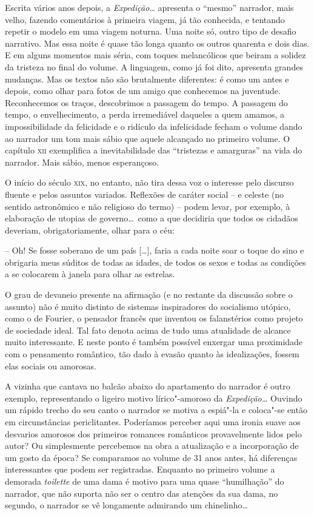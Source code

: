 Escrita vários anos depois, a \textit{Expedição\ldots} apresenta o ``mesmo''
narrador, mais velho, fazendo comentários à primeira viagem, já tão
conhecida, e tentando repetir o modelo em uma viagem noturna. Uma noite
só, outro tipo de desafio narrativo. Mas essa noite é quase tão longa
quanto os outros quarenta e dois dias. E em alguns momentos mais séria,
com toques melancólicos que beiram a solidez da tristeza no final do
volume. A linguagem, como já foi dito, apresenta grandes mudanças. Mas
os textos não são brutalmente diferentes: é como um antes e depois,
como olhar para fotos de um amigo que conhecemos na juventude.
Reconhecemos os traços, descobrimos a passagem do tempo. A passagem do
tempo, o envelhecimento, a perda irremediável daqueles a quem amamos, a
impossibilidade da felicidade e o ridículo da infelicidade fecham o
volume dando ao narrador um tom mais sábio que aquele alcançado no
primeiro volume. O capítulo \textsc{xii} exemplifica a inevitabilidade das
``tristezas e amarguras'' na vida do narrador. Mais sábio, menos
esperançoso. 

O início do século \textsc{xix}, no entanto, não tira dessa voz o interesse pelo
discurso fluente e pelos assuntos variados. Reflexões de caráter social
-- e celeste (no sentido astronômico e não religioso do termo) -- podem
levar, por exemplo, à elaboração de utopias de governo\ldots\ como a que
decidiria que todos os cidadãos deveriam, obrigatoriamente, olhar para o céu: 

\begin{hedraquote}
-- Oh! Se fosse soberano de um país [\ldots], faria a cada noite
soar o toque do sino e obrigaria meus súditos de todas as idades, de
todos os sexos e todas as condições a se colocarem à janela para olhar
as estrelas.
\end{hedraquote}

O grau de devaneio presente na afirmação (e no restante da discussão
sobre o assunto) não é muito distinto de sistemas inspiradores do
socialismo utópico, como o de Fourier, o pensador francês que inventou
os falanstérios como projeto de sociedade ideal. Tal fato denota acima
de tudo uma atualidade de alcance muito interessante. E neste ponto é
também possível enxergar uma proximidade com o pensamento romântico,
tão dado à evasão quanto às idealizações, fossem elas sociais ou
amorosas.

 A vizinha que cantava no balcão abaixo do apartamento do narrador é
outro exemplo, representando o ligeiro motivo lírico"-amoroso da
\textit{Expedição\ldots} Ouvindo um rápido trecho do seu canto o narrador
se motiva a espiá"-la e coloca"-se então em circunstâncias periclitantes.
Poderíamos perceber aqui uma ironia suave aos desvarios amorosos dos
primeiros romances românticos provavelmente lidos pelo autor? Ou
simplesmente percebemos na obra a atualização e a incorporação de um
gosto da época? Se comparamos ao volume de 31 anos antes, há diferenças
interessantes que podem ser registradas. Enquanto no primeiro volume a
demorada \textit{toilette} de uma dama é motivo para uma quase
``humilhação'' do narrador, que não suporta não ser o centro das atenções
da sua dama, no segundo, o narrador se vê longamente admirando um
chinelinho\ldots 

